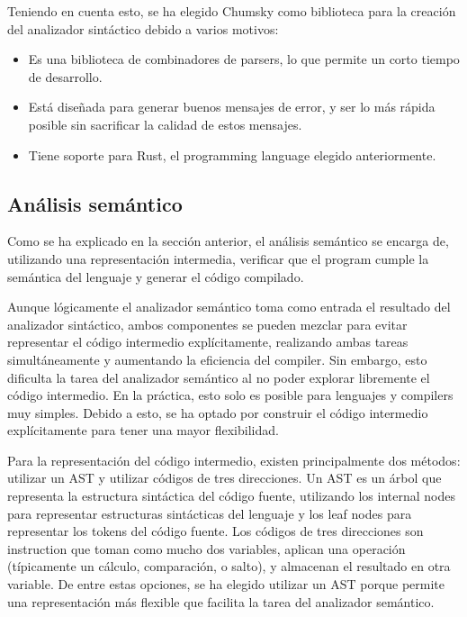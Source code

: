 Teniendo en cuenta esto, se ha elegido Chumsky como biblioteca para la creación
del analizador sintáctico debido a varios motivos:

\begin{itemize}
    \item Es una biblioteca de combinadores de \glspl{parser}, lo que permite un
    corto tiempo de desarrollo.
    \item Está diseñada para generar buenos mensajes de error, y ser lo más
    rápida posible sin sacrificar la calidad de estos mensajes.
    \item Tiene soporte para Rust, el \gls{programming language} elegido
    anteriormente.
\end{itemize}

\subsection{Análisis semántico}\label{subsec:compiler}

Como se ha explicado en la sección anterior, el análisis semántico se encarga
de, utilizando una representación intermedia, verificar que el \gls{program}
cumple la semántica del lenguaje y generar el código compilado.

Aunque lógicamente el analizador semántico toma como entrada el resultado del
analizador sintáctico, ambos componentes se pueden mezclar para evitar
representar el código intermedio explícitamente, realizando ambas tareas
simultáneamente y aumentando la eficiencia del \gls{compiler}. Sin embargo, esto
dificulta la tarea del analizador semántico al no poder explorar libremente el
código intermedio. En la práctica, esto solo es posible para lenguajes y
\glspl{compiler} muy simples. Debido a esto, se ha optado por construir el
código intermedio explícitamente para tener una mayor flexibilidad.
\parencite{compiler-design}

Para la representación del código intermedio, existen principalmente dos
métodos: utilizar un \gls{AST} y utilizar códigos de tres direcciones. Un
\gls{AST} es un árbol que representa la estructura sintáctica del código fuente,
utilizando los \glspl{internal node} para representar estructuras sintácticas
del lenguaje y los \glspl{leaf node} para representar los \glspl{token} del
código fuente. Los códigos de tres direcciones son \gls{instruction} que toman
como mucho dos variables, aplican una operación (típicamente un cálculo,
comparación, o salto), y almacenan el resultado en otra variable. De entre estas
opciones, se ha elegido utilizar un \gls{AST} porque permite una representación
más flexible que facilita la tarea del analizador semántico.
\parencite{dragon-book}

